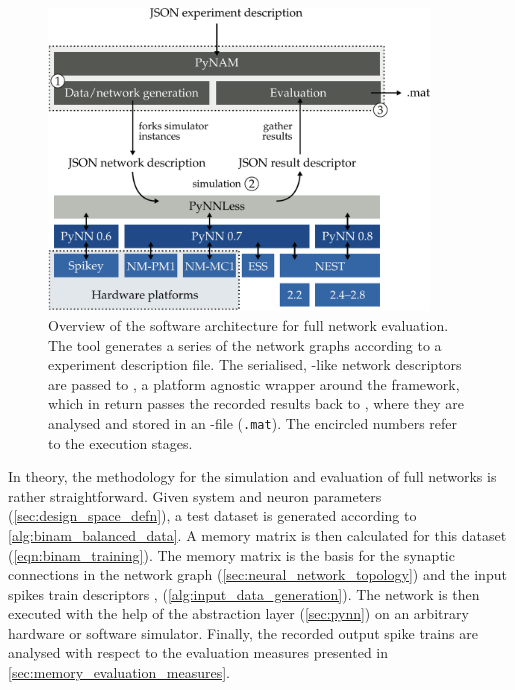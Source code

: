 \begin{figure}
	\centering
	\vspace*{1cm}
	\includegraphics[width=0.9\textwidth]{media/chp5/pynam.pdf}
	\vspace*{0.5cm}
	\caption[Overview of the full network evaluation software stack]{Overview of the software architecture for full network evaluation. The \PyNAM tool generates a series of the network graphs according to a \JSON experiment description file. The serialised, \JSON-like network descriptors are passed to \PyNNLess, a platform agnostic wrapper around the \PyNN framework, which in return passes the recorded results back to \PyNAM, where they are analysed and stored in an \HDF-file (\texttt{.mat}). The encircled numbers refer to the \PyNAM execution stages.}
	\label{fig:pynam}
\end{figure}

In theory, the methodology for the simulation and evaluation of full \BiNAM networks is rather straightforward. Given system and neuron parameters \nParams (\cref{sec:design_space_defn}), a test dataset \data is generated according to \cref{alg:binam_balanced_data}. A \BiNAM memory matrix \memMat is then calculated for this dataset (\cref{eqn:binam_training}). The memory matrix is the basis for the synaptic connections in the network graph (\cref{sec:neural_network_topology}) and the input spikes train descriptors \tIn, \kIn (\cref{alg:input_data_generation}). The network is then executed with the help of the \PyNN abstraction layer (\cref{sec:pynn}) on an arbitrary hardware or software simulator. Finally, the recorded output spike trains \tOut are analysed with respect to the evaluation measures presented in \cref{sec:memory_evaluation_measures}.

